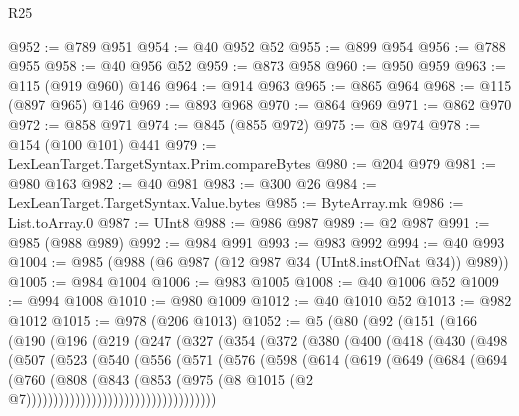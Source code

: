 \begin{lexlean}{R25}
\begin{coremodule}
{{{{{{{{{{{{{{{{{{{{{{{{{{{{{{{{{{{{{{{{{{{{{{{{{{{{{@952 := @789 @951
@954 := @40 @952 @52
@955 := @899 @954
@956 := @788 @955
@958 := @40 @956 @52
@959 := @873 @958
@960 := @950 @959
@963 := @115 (@919 @960) @146
@964 := @914 @963
@965 := @865 @964
@968 := @115 (@897 @965) @146
@969 := @893 @968
@970 := @864 @969
@971 := @862 @970
@972 := @858 @971
@974 := @845 (@855 @972)
@975 := @8 @974
@978 := @154 (@100 @101) @441
@979 := LexLeanTarget.TargetSyntax.Prim.compareBytes
@980 := @204 @979
@981 := @980 @163
@982 := @40 @981
@983 := @300 @26
@984 := LexLeanTarget.TargetSyntax.Value.bytes
@985 := ByteArray.mk
@986 := List.toArray.{0}
@987 := UInt8
@988 := @986 @987
@989 := @2 @987
@991 := @985 (@988 @989)
@992 := @984 @991
@993 := @983 @992
@994 := @40 @993
@1004 := @985 (@988 (@6 @987 (@12 @987 @34 (UInt8.instOfNat @34)) @989))
@1005 := @984 @1004
@1006 := @983 @1005
@1008 := @40 @1006 @52
@1009 := @994 @1008
@1010 := @980 @1009
@1012 := @40 @1010 @52
@1013 := @982 @1012
@1015 := @978 (@206 @1013)
@1052 := @5
    (@80
      (@92
        (@151
          (@166
            (@190
              (@196
                (@219
                  (@247
                    (@327
                      (@354
                        (@372
                          (@380
                            (@400
                              (@418
                                (@430
                                  (@498
                                    (@507
                                      (@523
                                        (@540
                                          (@556
                                            (@571
                                              (@576
                                                (@598
                                                  (@614
                                                    (@619
                                                      (@649
                                                        (@684
                                                          (@694
                                                            (@760
                                                              (@808
                                                                (@843
                                                                  (@853
                                                                    (@975
                                                                      (@8
                                                                        @1015
                                                                        (@2
                                                                          @7)))))))))))))))))))))))))))))))))))
}}}}}}}}}}}}}}}}}}}}}}}}}}}}}}}}}}}}}}}}}}}}}}}}}}}}}
\end{coremodule}
\end{lexlean}
